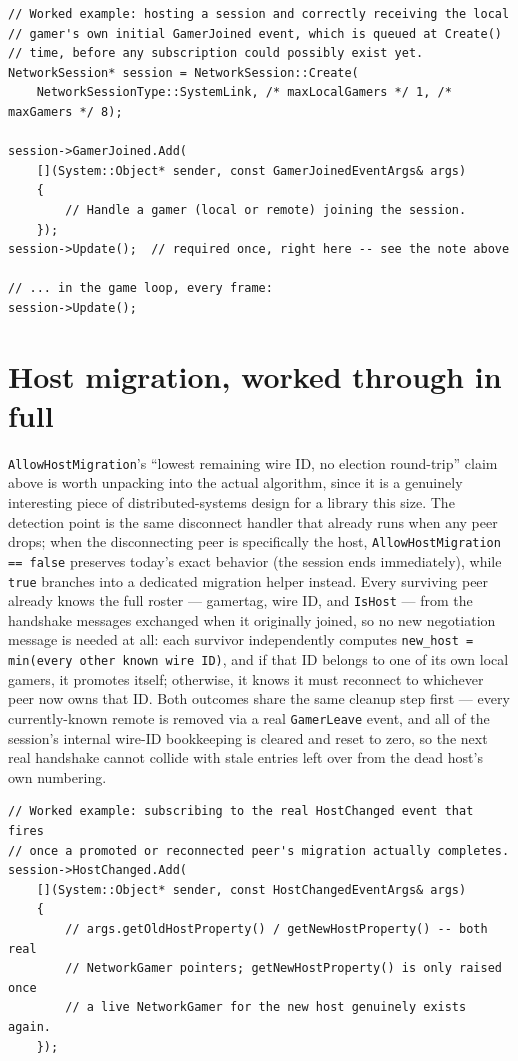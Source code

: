 \begin{lstlisting}
// Worked example: hosting a session and correctly receiving the local
// gamer's own initial GamerJoined event, which is queued at Create()
// time, before any subscription could possibly exist yet.
NetworkSession* session = NetworkSession::Create(
    NetworkSessionType::SystemLink, /* maxLocalGamers */ 1, /* maxGamers */ 8);

session->GamerJoined.Add(
    [](System::Object* sender, const GamerJoinedEventArgs& args)
    {
        // Handle a gamer (local or remote) joining the session.
    });
session->Update();  // required once, right here -- see the note above

// ... in the game loop, every frame:
session->Update();
\end{lstlisting}

\section{Host migration, worked through in full}

\texttt{AllowHostMigration}'s ``lowest remaining wire ID, no election round-trip'' claim above
is worth unpacking into the actual algorithm, since it is a genuinely interesting piece of
distributed-systems design for a library this size. The detection point is the same
disconnect handler that already runs when any peer drops; when the disconnecting peer is
specifically the host, \texttt{AllowHostMigration == false} preserves today's exact behavior
(the session ends immediately), while \texttt{true} branches into a dedicated migration
helper instead. Every surviving peer already knows the full roster --- gamertag, wire ID, and
\texttt{IsHost} --- from the handshake messages exchanged when it originally joined, so no new
negotiation message is needed at all: each survivor independently computes
\texttt{new\_host = min(every other known wire ID)}, and if that ID belongs to one of its own
local gamers, it promotes itself; otherwise, it knows it must reconnect to whichever peer now
owns that ID. Both outcomes share the same cleanup step first --- every currently-known remote
 is removed via a real \texttt{GamerLeave} event, and all of the
session's internal wire-ID bookkeeping is cleared and reset to zero, so the next real handshake
cannot collide with stale entries left over from the dead host's own numbering.

\begin{lstlisting}
// Worked example: subscribing to the real HostChanged event that fires
// once a promoted or reconnected peer's migration actually completes.
session->HostChanged.Add(
    [](System::Object* sender, const HostChangedEventArgs& args)
    {
        // args.getOldHostProperty() / getNewHostProperty() -- both real
        // NetworkGamer pointers; getNewHostProperty() is only raised once
        // a live NetworkGamer for the new host genuinely exists again.
    });
\end{lstlisting}

